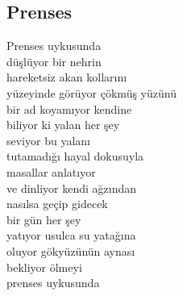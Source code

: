 \subsection{Prenses}

Prenses uykusunda \\
düşlüyor bir nehrin \\
hareketsiz akan kollarını \\
yüzeyinde görüyor çökmüş yüzünü \\
bir ad koyamıyor kendine \\

\noindent\newline
biliyor ki yalan her şey \\
seviyor bu yalanı \\
tutamadığı hayal dokusuyla \\
masallar anlatıyor \\
ve dinliyor kendi ağzından \\

\noindent\newline
nasılsa geçip gidecek \\
bir gün her şey \\
yatıyor usulca su yatağına \\
oluyor gökyüzünün aynası \\
bekliyor ölmeyi \\
prenses uykusunda \\